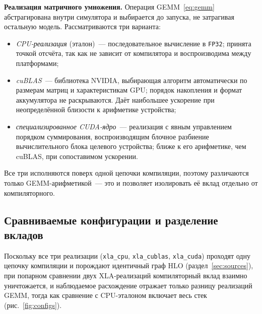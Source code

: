 \textbf{Реализация матричного умножения.} Операция GEMM~\eqref{eq:gemm}
абстрагирована внутри симулятора и выбирается до запуска, не затрагивая остальную
модель. Рассматриваются три варианта:
\begin{itemize}
    \item \emph{CPU-реализация} (эталон)~--- последовательное вычисление в
        \texttt{FP32}; принята точкой отсчёта, так как не зависит от компилятора и
        воспроизводима между платформами;
    \item \emph{cuBLAS}~--- библиотека NVIDIA, выбирающая алгоритм автоматически по
        размерам матриц и характеристикам GPU; порядок накопления и формат
        аккумулятора не раскрываются. Даёт наибольшее ускорение при неопределённой
        близости к арифметике устройства;
    \item \emph{специализированное CUDA-ядро}~--- реализация с явным управлением
        порядком суммирования, воспроизводящим блочное разбиение вычислительного
        блока целевого устройства; ближе к его арифметике, чем cuBLAS, при
        сопоставимом ускорении.
\end{itemize}
Все три исполняются поверх одной цепочки компиляции, поэтому различаются только
GEMM-арифметикой~--- это и позволяет изолировать её вклад отдельно от
компиляторного.

\subsection{Сравниваемые конфигурации и разделение вкладов}

Поскольку все три реализации (\texttt{xla\_cpu}, \texttt{xla\_cublas},
\texttt{xla\_cuda}) проходят одну цепочку компиляции и порождают идентичный граф
HLO (раздел~\ref{sec:sources}), при попарном сравнении двух XLA-реализаций
компиляторный вклад взаимно уничтожается, и наблюдаемое расхождение отражает
только разницу реализаций GEMM, тогда как сравнение с CPU-эталоном включает весь
стек (рис.~\ref{fig:configs}).

